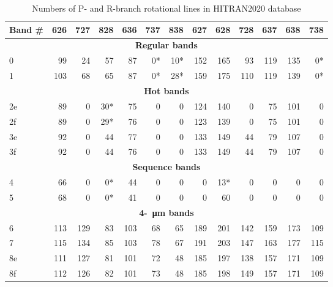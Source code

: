 \begin{table}
\caption{Numbers of P- and R-branch rotational lines in HITRAN2020 database}
\label{table:HITRAN}
\centering
\begin{tabular}{lrrrrrrrrrrrr}
\hline 
Band \# & 626 & 727 & 828 & 636 & 737 & 838 & 627 & 628 & 728 & 637 & 638 & 738 \\
\hline 
\multicolumn{13}{c}{\textbf{Regular bands}}                                     \\
0       & 99  & 24  & 57  & 87  & 0*  & 10* & 152 & 165 & 93  & 119 & 135 & 0*  \\
1       & 103 & 68  & 65  & 87  & 0*  & 28* & 159 & 175 & 110 & 119 & 139 & 0*  \\
\multicolumn{13}{c}{\textbf{Hot bands}}                                         \\
2e      & 89  & 0   & 30* & 75  & 0   & 0   & 124 & 140 & 0   & 75  & 101 & 0   \\
2f      & 89  & 0   & 29* & 76  & 0   & 0   & 123 & 139 & 0   & 75  & 101 & 0   \\
3e      & 92  & 0   & 44  & 77  & 0   & 0   & 133 & 149 & 44  & 79  & 107 & 0   \\
3f      & 92  & 0   & 44  & 76  & 0   & 0   & 133 & 149 & 44  & 79  & 107 & 0   \\
\multicolumn{13}{c}{\textbf{Sequence bands}}                                    \\
4       & 66  & 0   & 0*  & 44  & 0   & 0   & 0   & 13* & 0   & 0   & 0   & 0   \\
5       & 68  & 0   & 0*  & 41  & 0   & 0   & 0   & 60  & 0   & 0   & 0   & 0   \\
\multicolumn{13}{c}{\textbf{4-\SI{}{\micro\meter} bands}}                       \\
6       & 113 & 129 & 83  & 103 & 68  & 65  & 189 & 201 & 142 & 159 & 173 & 109 \\
7       & 115 & 134 & 85  & 103 & 78  & 67  & 191 & 203 & 147 & 163 & 177 & 115 \\
8e      & 111 & 127 & 81  & 101 & 72  & 48  & 185 & 197 & 138 & 157 & 171 & 109 \\
8f      & 112 & 126 & 82  & 101 & 73  & 48  & 185 & 198 & 149 & 157 & 171 & 109 \\
\hline 
\end{tabular}
\end{table}


